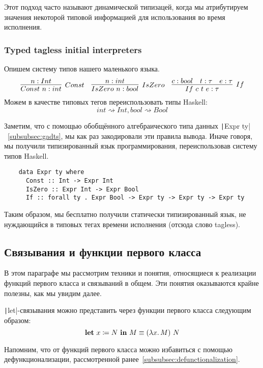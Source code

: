 Этот подход часто называют динамической типизацей, когда мы атрибутируем значения некоторой типовой информацией для использования во время исполнения.

\subsubsection{Typed tagless initial interpreters}

Опишем систему типов нашего маленького языка.
\begin{equation*}{}
    \infer[Const]{Const~n : int}{n : Int}
    \quad
    \infer[IsZero]{IsZero~n : bool}{n : int}
    \quad
    \infer[If]{If~c~t~e : \tau}{c : bool & t : \tau & e : \tau}
\end{equation*}
Можем в качестве типовых тегов переиспользовать типы Haskell: \[int \rightsquigarrow Int, bool \rightsquigarrow Bool\]

Заметим, что с помощью обобщённого алгебраического типа данных \texttt|Expr ty|~\ref{subsubsec:gadts}, мы как раз закодировали эти правила вывода.
Иначе говоря, мы получили типизированный язык программирования, переиспользовав систему типов Haskell.
\begin{verbatim}
    data Expr ty where
      Const :: Int -> Expr Int
      IsZero :: Expr Int -> Expr Bool
      If :: forall ty . Expr Bool -> Expr ty -> Expr ty -> Expr ty
\end{verbatim}

Таким образом, мы бесплатно получили статически типизированный язык, не нуждающийся в типовых тегах времени исполнения (отсюда слово tagless).

\subsection{Связывания и функции первого класса} \label{subsec:first-class-functions}

В этом параграфе мы рассмотрим техники и понятия, относящиеся к реализации функций первого класса и связываний в общем.
Эти понятия оказываются крайне полезны, как мы увидим далее.

\texttt|let|-связывания можно представить через функции первого класса следующим образом:
\[
    \mathbf{let} ~ x \coloneqq N ~ \mathbf{in} ~ M \equiv (\lambda x\ldotp M) ~ N
\]

Напомним, что от функций первого класса можно избавиться с помощью дефункционализации, рассмотренной ранее~\ref{subsubsec:defunctionalization}.

